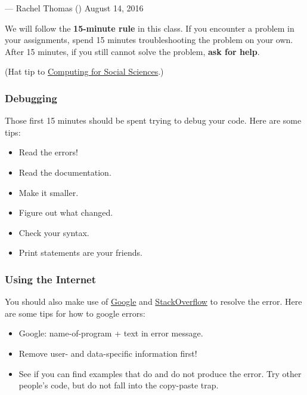 \documentclass[]{book}
\providecommand{\tightlist}{%
  \setlength{\itemsep}{0pt}\setlength{\parskip}{0pt}}
\begin{document}
--- Rachel Thomas (\citet{math_rachel}) August 14, 2016

We will follow the \textbf{15-minute rule} in this class. If you
encounter a problem in your assignments, spend 15 minutes
troubleshooting the problem on your own. After 15 minutes, if you still
cannot solve the problem, \textbf{ask for help}.

(Hat tip to
\href{https://cfss.uchicago.edu/faq/asking-questions/}{Computing for
Social Sciences}.)

\subsubsection*{Debugging}\label{debugging}

Those first 15 minutes should be spent trying to debug your code. Here
are some tips:

\begin{itemize}
\tightlist
\item
  Read the errors!
\item
  Read the documentation.
\item
  Make it smaller.
\item
  Figure out what changed.
\item
  Check your syntax.
\item
  Print statements are your friends.
\end{itemize}

\subsubsection*{Using the Internet}\label{using-the-internet}

You should also make use of \href{https://www.google.com}{Google} and
\href{http://stackoverflow.com/}{StackOverflow} to resolve the error.
Here are some tips for how to google errors:

\begin{itemize}
\tightlist
\item
  Google: name-of-program + text in error message.
\item
  Remove user- and data-specific information first!
\item
  See if you can find examples that do and do not produce the error. Try
  other people's code, but do not fall into the copy-paste trap.
\end{itemize}
\end{document}
